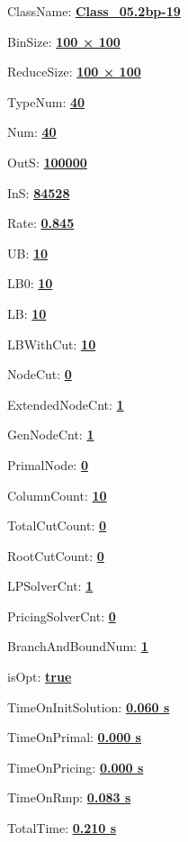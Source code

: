 \documentclass[11pt]{article}
\begin{document}
\pagestyle{empty}


ClassName: \underline{\textbf{Class_05.2bp-19}}
\par
BinSize: \underline{\textbf{100 × 100}}
\par
ReduceSize: \underline{\textbf{100 × 100}}
\par
TypeNum: \underline{\textbf{40}}
\par
Num: \underline{\textbf{40}}
\par
OutS: \underline{\textbf{100000}}
\par
InS: \underline{\textbf{84528}}
\par
Rate: \underline{\textbf{0.845}}
\par
UB: \underline{\textbf{10}}
\par
LB0: \underline{\textbf{10}}
\par
LB: \underline{\textbf{10}}
\par
LBWithCut: \underline{\textbf{10}}
\par
NodeCut: \underline{\textbf{0}}
\par
ExtendedNodeCnt: \underline{\textbf{1}}
\par
GenNodeCnt: \underline{\textbf{1}}
\par
PrimalNode: \underline{\textbf{0}}
\par
ColumnCount: \underline{\textbf{10}}
\par
TotalCutCount: \underline{\textbf{0}}
\par
RootCutCount: \underline{\textbf{0}}
\par
LPSolverCnt: \underline{\textbf{1}}
\par
PricingSolverCnt: \underline{\textbf{0}}
\par
BranchAndBoundNum: \underline{\textbf{1}}
\par
isOpt: \underline{\textbf{true}}
\par
TimeOnInitSolution: \underline{\textbf{0.060 s}}
\par
TimeOnPrimal: \underline{\textbf{0.000 s}}
\par
TimeOnPricing: \underline{\textbf{0.000 s}}
\par
TimeOnRmp: \underline{\textbf{0.083 s}}
\par
TotalTime: \underline{\textbf{0.210 s}}
\par
\newpage


\end{document}
